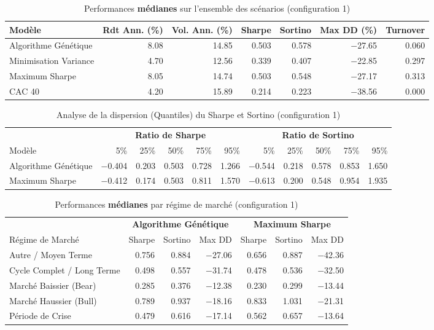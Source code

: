 \begin{table}[H]
\centering
\caption{Performances \textbf{médianes} sur l'ensemble des scénarios (configuration 1)\label{tab:overall_conf1}}
\footnotesize
\begin{tabular}{lrrrrrr}
\toprule
Modèle & \small Rdt Ann. (\%) & \small Vol. Ann. (\%) & \small Sharpe & \small Sortino & \small Max DD (\%) & \small Turnover \\
\midrule
Algorithme Génétique & 8.08 & 14.85 & 0.503 & 0.578 & $-$27.65 & 0.060 \\
Minimisation Variance & 4.70 & 12.56 & 0.339 & 0.407 & $-$22.85 & 0.297 \\
Maximum Sharpe & 8.05 & 14.74 & 0.503 & 0.548 & $-$27.17 & 0.313 \\
CAC 40 & 4.20 & 15.89 & 0.214 & 0.223 & $-$38.56 & 0.000 \\
\bottomrule
\end{tabular}
\end{table}

\begin{table}[H]
\centering
\caption{Analyse de la dispersion (Quantiles) du Sharpe et Sortino (configuration 1)\label{tab:quantiles_conf1}}
\footnotesize
\begin{tabular}{l|rrrrr|rrrrr}
\toprule
& \multicolumn{5}{c|}{\textbf{Ratio de Sharpe}} & \multicolumn{5}{c}{\textbf{Ratio de Sortino}} \\
Modèle & 5\% & 25\% & 50\% & 75\% & 95\% & 5\% & 25\% & 50\% & 75\% & 95\% \\
\midrule
Algorithme Génétique & $-$0.404 & 0.203 & 0.503 & 0.728 & 1.266 & $-$0.544 & 0.218 & 0.578 & 0.853 & 1.650 \\
Maximum Sharpe & $-$0.412 & 0.174 & 0.503 & 0.811 & 1.570 & $-$0.613 & 0.200 & 0.548 & 0.954 & 1.935 \\
\bottomrule
\end{tabular}
\end{table}

\begin{table}[H]
\centering
\caption{Performances \textbf{médianes} par régime de marché (configuration 1)\label{tab:regime_conf1}}
\footnotesize
\begin{tabular}{l|rrr|rrr}
\toprule
& \multicolumn{3}{c|}{\textbf{Algorithme Génétique}} & \multicolumn{3}{c}{\textbf{Maximum Sharpe}} \\
Régime de Marché & Sharpe & Sortino & Max DD & Sharpe & Sortino & Max DD \\
\midrule
Autre / Moyen Terme & 0.756 & 0.884 & $-$27.06 & 0.656 & 0.887 & $-$42.36 \\
Cycle Complet / Long Terme & 0.498 & 0.557 & $-$31.74 & 0.478 & 0.536 & $-$32.50 \\
Marché Baissier (Bear) & 0.285 & 0.376 & $-$12.38 & 0.230 & 0.299 & $-$13.44 \\
Marché Haussier (Bull) & 0.789 & 0.937 & $-$18.16 & 0.833 & 1.031 & $-$21.31 \\
Période de Crise & 0.479 & 0.616 & $-$17.14 & 0.562 & 0.657 & $-$13.64 \\
\bottomrule
\end{tabular}
\end{table}

